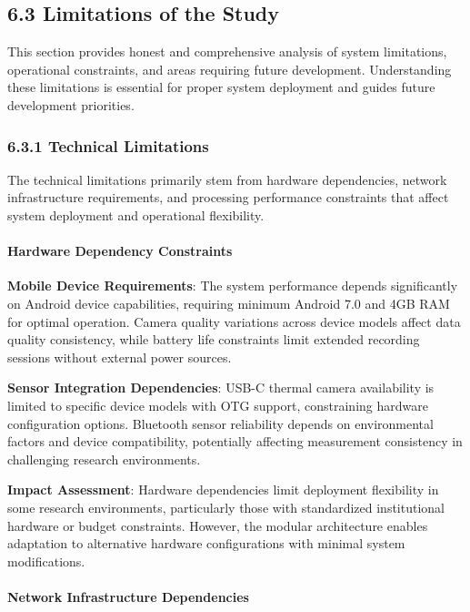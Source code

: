 \documentclass[11pt,a4paper]{article}
\begin{document}
\subsection{6.3 Limitations of the Study}

This section provides honest and comprehensive analysis of system limitations, operational constraints, and areas
requiring future development. Understanding these limitations is essential for proper system deployment and guides
future development priorities.

\subsubsection{6.3.1 Technical Limitations}

The technical limitations primarily stem from hardware dependencies, network infrastructure requirements, and processing
performance constraints that affect system deployment and operational flexibility.

\paragraph{Hardware Dependency Constraints}

\textbf{Mobile Device Requirements}: The system performance depends significantly on Android device capabilities, requiring
minimum Android 7.0 and 4GB RAM for optimal operation. Camera quality variations across device models affect data
quality consistency, while battery life constraints limit extended recording sessions without external power sources.

\textbf{Sensor Integration Dependencies}: USB-C thermal camera availability is limited to specific device models with OTG
support, constraining hardware configuration options. Bluetooth sensor reliability depends on environmental factors and
device compatibility, potentially affecting measurement consistency in challenging research environments.

\textbf{Impact Assessment}: Hardware dependencies limit deployment flexibility in some research environments, particularly
those with standardized institutional hardware or budget constraints. However, the modular architecture enables
adaptation to alternative hardware configurations with minimal system modifications.

\paragraph{Network Infrastructure Dependencies}
\end{document}
